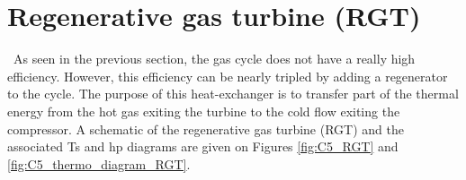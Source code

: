 \section{Regenerative gas turbine (RGT)}
\quad\, As seen in the previous section, the gas cycle does not have a really high efficiency. However, this efficiency can be nearly tripled by adding a regenerator to the cycle. The purpose of this heat-exchanger is to transfer part of the thermal energy from the hot gas exiting the turbine to the cold flow exiting the compressor. A schematic of the regenerative gas turbine (RGT) and the associated Ts and hp diagrams are given on Figures \ref{fig:C5_RGT} and \ref{fig:C5_thermo_diagram_RGT}. 

